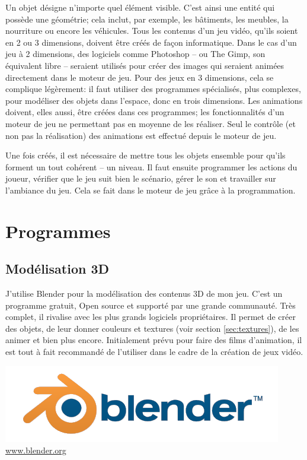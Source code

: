 Un objet désigne n'importe quel élément visible. C'est ainsi une entité qui possède une géométrie; cela inclut, par exemple, les bâtiments, les meubles, la nourriture ou encore les véhicules. Tous les contenus d'un jeu vidéo, qu'ils soient en 2 ou 3 dimensions, doivent être créés de façon informatique. Dans le cas d'un jeu à 2 dimensions, des logiciels comme Photoshop -- ou The Gimp, son équivalent libre -- seraient utilisés pour créer des images qui seraient animées directement dans le moteur de jeu. Pour des jeux en 3 dimensions, cela se complique légèrement: il faut utiliser des programmes spécialisés, plus complexes, pour modéliser des objets dans l'espace, donc en trois dimensions. Les animations doivent, elles aussi, être créées dans ces programmes; les fonctionnalités d'un moteur de jeu ne permettant pas en moyenne de les réaliser. Seul le contrôle (et non pas la réalisation) des animations est effectué depuis le moteur de jeu.

Une fois créés, il est nécessaire de mettre tous les objets ensemble pour qu'ils forment un tout cohérent -- un niveau. Il faut ensuite programmer les actions du joueur, vérifier que le jeu suit bien le scénario, gérer le son et travailler sur l'ambiance du jeu. Cela se fait dans le moteur de jeu grâce à la programmation.


\section{Programmes}
\subsection{Modélisation 3D}
\label{sec:modelisationContenu3D}
J'utilise Blender pour la modélisation des contenus 3D de mon jeu. C'est un programme gratuit, Open source et supporté par une grande communauté. Très complet, il rivalise avec les plus grands logiciels propriétaires. Il permet de créer des objets, de leur donner couleurs et textures (voir section \ref{sec:textures}), de les animer et bien plus encore. Initialement prévu pour faire des films d'animation, il est tout à fait recommandé de l'utiliser dans le cadre de la création de jeux vidéo.

\begin{center}
\includegraphics[width=.5\textwidth]{./images/Technique/blender-plain.png}
\\[-4mm]\hspace*{5mm}\url{www.blender.org}
\end{center}

